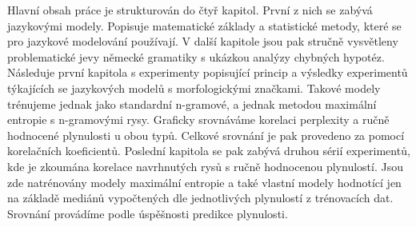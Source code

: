 \documentclass[12pt,a4paper]{report}
\begin{document}
Hlavní obsah práce je strukturován do čtyř kapitol. První z nich se zabývá jazykovými modely. Popisuje matematické základy a statistické metody, které se pro jazykové modelování používají. V další kapitole jsou pak stručně vysvětleny problematické jevy německé gramatiky s ukázkou analýzy chybných hypotéz. Následuje první kapitola s experimenty popisující princip a výsledky experimentů týkajících se jazykových modelů s morfologickými značkami. Takové modely trénujeme jednak jako standardní n-gramové, a jednak metodou maximální entropie s n-gramovými rysy. Graficky srovnáváme korelaci perplexity a ručně hodnocené plynulosti u obou typů. Celkové srovnání je pak provedeno za pomocí korelačních koeficientů. Poslední kapitola se pak zabývá druhou sérií experimentů, kde je zkoumána korelace navrhnutých rysů s ručně hodnocenou plynulostí. Jsou zde natrénovány modely maximální entropie a také vlastní modely hodnotící jen na základě mediánů vypočtených dle jednotlivých plynulostí z trénovacích dat. Srovnání provádíme podle úspěšnosti predikce plynulosti.










\end{document}
